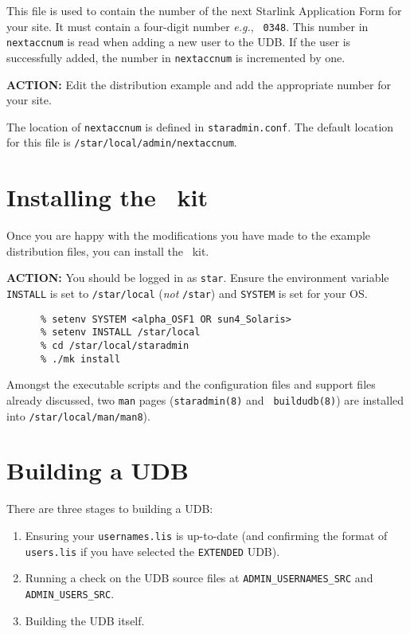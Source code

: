 This file is used to contain the number of the next Starlink Application
Form for your site. It must contain a four-digit number {\em e.g.}, {\tt
0348}. This number in {\tt nextaccnum} is read when adding a new user to
the UDB. If the user is successfully added, the number in {\tt nextaccnum}
is incremented by one. 

{\large\bf ACTION:} Edit the distribution example and add the appropriate
number for your site.

The location of {\tt nextaccnum} is defined in {\tt staradmin.conf}.
The default location for this file is \newline
{\tt /star/local/admin/nextaccnum}.

\section{Installing the \staradmin\ kit}

Once you are happy with the modifications you have made to the example
distribution files, you can install the \staradmin\ kit.

{\large\bf ACTION:} You should be logged in as {\tt star}. Ensure the
environment variable {\tt INSTALL} is set to {\tt /star/local} ({\em not}
{\tt /star}) and {\tt SYSTEM} is set for your OS. 

\begin{verbatim}
      % setenv SYSTEM <alpha_OSF1 OR sun4_Solaris>
      % setenv INSTALL /star/local
      % cd /star/local/staradmin
      % ./mk install
\end{verbatim}

Amongst the executable scripts and the configuration files and support
files already discussed, two {\tt man} pages ({\tt staradmin(8)} and {\tt
buildudb(8)}) are installed into {\tt /star/local/man/man8}). 

\section{Building a UDB}

There are three stages to building a UDB:

\begin{enumerate}

\item Ensuring your {\tt usernames.\-lis} is up-to-date (and confirming
the format of {\tt users.lis} if you have selected the {\tt EXTENDED}
UDB). 

\item Running a check on the UDB source files at {\tt ADMIN\_USERNAMES\_SRC}
and {\tt ADMIN\_USERS\_SRC}. 

\item Building the UDB itself.

\end{enumerate}

